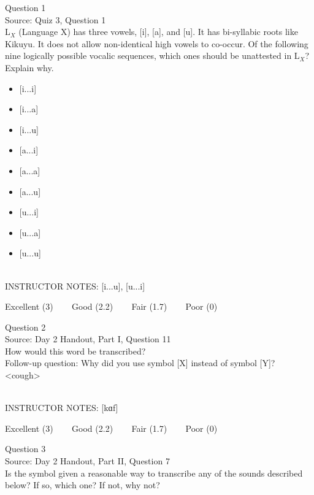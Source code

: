 \documentclass[12pt]{article}
\begin{document}
{\large Question 1}\\

Source: Quiz 3, Question 1\\

L$_X$ (Language X) has three vowels, [i], [a], and [u]. It has bi-syllabic roots like Kikuyu. It does not allow non-identical high vowels to co-occur. Of the following nine logically possible vocalic sequences, which ones should be unattested in L$_X$? Explain why.\\

\begin{itemize} \item {[i...i]} \item {[i...a]} \item {[i...u]} \item {[a...i]} \item {[a...a]} \item {[a...u]} \item {[u...i]} \item {[u...a]} \item {[u...u]} \end{itemize}


~\\
INSTRUCTOR NOTES: [i...u], [u...i]


\vfill
Excellent (3) ~~~ Good (2.2) ~~~ Fair (1.7) ~~~ Poor (0)
\newpage

{\large Question 2}\\

Source: Day 2 Handout, Part I, Question 11\\

How would this word be transcribed?\\ Follow-up question: Why did you use symbol [X] instead of symbol [Y]?\\

<cough>


~\\
INSTRUCTOR NOTES: [kɑf]


\vfill
Excellent (3) ~~~ Good (2.2) ~~~ Fair (1.7) ~~~ Poor (0)
\newpage

{\large Question 3}\\

Source: Day 2 Handout, Part II, Question 7\\

Is the symbol given a reasonable way to transcribe any of the sounds described below? If so, which one? If not, why not?\\
\end{document}
